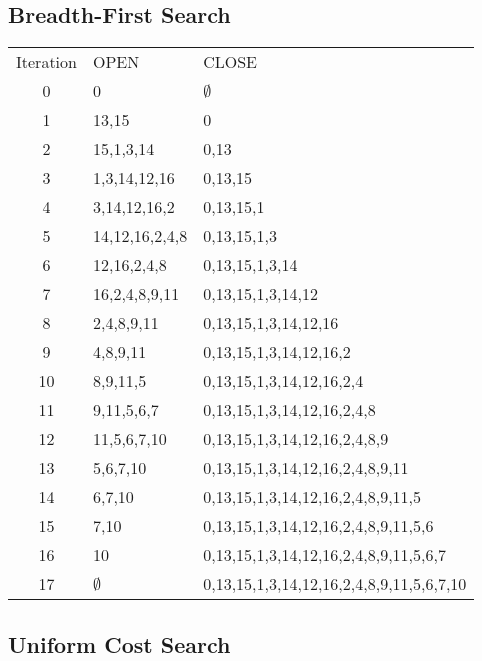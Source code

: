 \documentclass[11pt]{article}
\begin{document}
\subsection{Breadth-First Search}
\begin{tabular}{ c | l | l }
  Iteration & OPEN & CLOSE \\
  0 	&	0 				& $\emptyset$ \\
  1		&	13,15			&	0	\\
  2		&	15,1,3,14		&	0,13	\\
  3		&	1,3,14,12,16	&	0,13,15	\\
  4		&	3,14,12,16,2	&	0,13,15,1	\\
  5		&	14,12,16,2,4,8	&	0,13,15,1,3	\\
  6		&	12,16,2,4,8		&	0,13,15,1,3,14	\\
  7		&	16,2,4,8,9,11	&	0,13,15,1,3,14,12	\\
  8		&	2,4,8,9,11		&	0,13,15,1,3,14,12,16	\\
  9		&	4,8,9,11		&	0,13,15,1,3,14,12,16,2	\\
  10	&	8,9,11,5		&	0,13,15,1,3,14,12,16,2,4	\\
  11	&	9,11,5,6,7		&	0,13,15,1,3,14,12,16,2,4,8	\\
  12	&	11,5,6,7,10		&	0,13,15,1,3,14,12,16,2,4,8,9	\\
  13	&	5,6,7,10			&	0,13,15,1,3,14,12,16,2,4,8,9,11	\\
  14	&	6,7,10			&	0,13,15,1,3,14,12,16,2,4,8,9,11,5	\\
  15	&	7,10			&	0,13,15,1,3,14,12,16,2,4,8,9,11,5,6	\\
  16	&	10				&	0,13,15,1,3,14,12,16,2,4,8,9,11,5,6,7	\\
  17	&$\emptyset$		&	0,13,15,1,3,14,12,16,2,4,8,9,11,5,6,7,10	\\
 \end{tabular}

\subsection{Uniform Cost Search}
\end{document}
